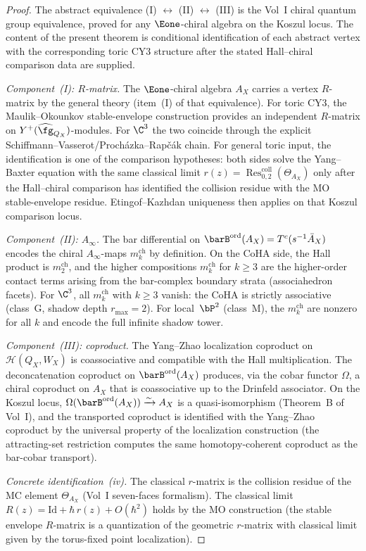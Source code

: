 \begin{proof}
The abstract equivalence (I) $\leftrightarrow$ (II)
$\leftrightarrow$ (III) is the Vol~I chiral quantum group equivalence,
proved for any $\Eone$-chiral algebra on the Koszul locus. The content
of the present theorem is conditional identification of each abstract
vertex with the corresponding toric CY3 structure after the stated
Hall--chiral comparison data are supplied.

\textit{Component~\textup{(I)}: $R$-matrix.}
The $\Eone$-chiral algebra $A_X$ carries a vertex
$R$-matrix by the general theory
(item~\textup{(I)} of that equivalence). For toric CY3, the
Maulik--Okounkov stable-envelope construction provides an
independent $R$-matrix on $Y^+(\widehat{\fg}_{Q_X})$-modules.
For $\C^3$ the two coincide through the explicit
Schiffmann--Vasserot/Proch\'azka--Rap\v{c}\'ak chain. For general toric
input, the identification is one of the comparison hypotheses: both
sides solve the Yang--Baxter equation with the same classical limit
$r(z) = \operatorname{Res}^{\mathrm{coll}}_{0,2}(\Theta_{A_X})$ only
after the Hall--chiral comparison has identified the collision residue
with the MO stable-envelope residue. Etingof--Kazhdan uniqueness then
applies on that Koszul comparison locus.

\textit{Component~\textup{(II)}: $A_\infty$.}
The bar differential on $\barB^{\mathrm{ord}}(A_X)
= T^c(s^{-1}\bar{A}_X)$ encodes the chiral
$A_\infty$-maps $m_k^{\mathrm{ch}}$ by definition.
On the CoHA side, the Hall product is
$m_2^{\mathrm{ch}}$, and the higher compositions
$m_k^{\mathrm{ch}}$ for $k \geq 3$ are the
higher-order contact terms arising from the
bar-complex boundary strata (associahedron facets).
For $\C^3$, all $m_k^{\mathrm{ch}}$ with $k \geq 3$
vanish: the CoHA is strictly associative (class~G,
shadow depth $r_{\max} = 2$). For local~$\bP^2$
(class~M), the $m_k^{\mathrm{ch}}$ are nonzero for
all $k$ and encode the full infinite shadow tower.

\textit{Component~\textup{(III)}: coproduct.}
The Yang--Zhao localization coproduct on
$\mathcal{H}(Q_X, W_X)$ is coassociative and compatible
with the Hall multiplication. The deconcatenation coproduct
on $\barB^{\mathrm{ord}}(A_X)$ produces, via the cobar
functor $\Omega$, a chiral coproduct on $A_X$ that is
coassociative up to the Drinfeld associator. On the Koszul
locus, $\Omega(\barB^{\mathrm{ord}}(A_X))
\xrightarrow{\sim} A_X$ is a quasi-isomorphism
(Theorem~B of Vol~I), and the
transported coproduct is identified with the Yang--Zhao
coproduct by the universal property of the localization
construction (the attracting-set restriction computes the
same homotopy-coherent coproduct as the bar-cobar
transport).

\textit{Concrete identification~(iv).}
The classical $r$-matrix is the collision residue of
the MC element $\Theta_{A_X}$
(Vol~I seven-faces formalism). The classical limit
$R(z) = \mathrm{Id} + \hbar\, r(z) + O(\hbar^2)$
holds by the MO construction (the stable envelope
$R$-matrix is a quantization of the geometric
$r$-matrix with classical limit given by the
torus-fixed point localization).
\end{proof}

